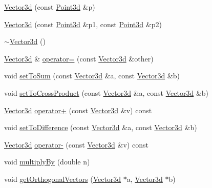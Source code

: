 \begin{DoxyCompactItemize}
\item 
\hyperlink{classCartWheel_1_1Math_1_1Vector3d_a17c21f1f773476888dfe0c370469428f}{Vector3d} (const \hyperlink{classCartWheel_1_1Math_1_1Point3d}{Point3d} \&p)
\item 
\hyperlink{classCartWheel_1_1Math_1_1Vector3d_a56c32bfaec62092b7c62df53a7516110}{Vector3d} (const \hyperlink{classCartWheel_1_1Math_1_1Point3d}{Point3d} \&p1, const \hyperlink{classCartWheel_1_1Math_1_1Point3d}{Point3d} \&p2)
\item 
\hyperlink{classCartWheel_1_1Math_1_1Vector3d_ab0d497b2a1ee352d181b22986f4b258b}{$\sim$Vector3d} ()
\item 
\hyperlink{classCartWheel_1_1Math_1_1Vector3d}{Vector3d} \& \hyperlink{classCartWheel_1_1Math_1_1Vector3d_a51f18ca24a4f9866923ea9fd85839144}{operator=} (const \hyperlink{classCartWheel_1_1Math_1_1Vector3d}{Vector3d} \&other)
\item 
void \hyperlink{classCartWheel_1_1Math_1_1Vector3d_a6dcc127ab57cfcd20c72c7fc74153264}{setToSum} (const \hyperlink{classCartWheel_1_1Math_1_1Vector3d}{Vector3d} \&a, const \hyperlink{classCartWheel_1_1Math_1_1Vector3d}{Vector3d} \&b)
\item 
void \hyperlink{classCartWheel_1_1Math_1_1Vector3d_abfd7864901a584e868f311a9e13bc7c7}{setToCrossProduct} (const \hyperlink{classCartWheel_1_1Math_1_1Vector3d}{Vector3d} \&a, const \hyperlink{classCartWheel_1_1Math_1_1Vector3d}{Vector3d} \&b)
\item 
\hyperlink{classCartWheel_1_1Math_1_1Vector3d}{Vector3d} \hyperlink{classCartWheel_1_1Math_1_1Vector3d_a4ca951f7fb6910e5c2449b993ef97ca1}{operator+} (const \hyperlink{classCartWheel_1_1Math_1_1Vector3d}{Vector3d} \&v) const 
\item 
void \hyperlink{classCartWheel_1_1Math_1_1Vector3d_a8d4b497bf732f0d9685cbde6aaacb833}{setToDifference} (const \hyperlink{classCartWheel_1_1Math_1_1Vector3d}{Vector3d} \&a, const \hyperlink{classCartWheel_1_1Math_1_1Vector3d}{Vector3d} \&b)
\item 
\hyperlink{classCartWheel_1_1Math_1_1Vector3d}{Vector3d} \hyperlink{classCartWheel_1_1Math_1_1Vector3d_ab93781eb32a9cb2ed4c203b590395937}{operator-\/} (const \hyperlink{classCartWheel_1_1Math_1_1Vector3d}{Vector3d} \&v) const 
\item 
void \hyperlink{classCartWheel_1_1Math_1_1Vector3d_af3f6c9c83c7f19a1ef765159ed42c5d0}{multiplyBy} (double n)
\item 
void \hyperlink{classCartWheel_1_1Math_1_1Vector3d_a9c2953954890c8031427943f7aef39ab}{getOrthogonalVectors} (\hyperlink{classCartWheel_1_1Math_1_1Vector3d}{Vector3d} $\ast$a, \hyperlink{classCartWheel_1_1Math_1_1Vector3d}{Vector3d} $\ast$b)

\end{DoxyCompactItemize}
